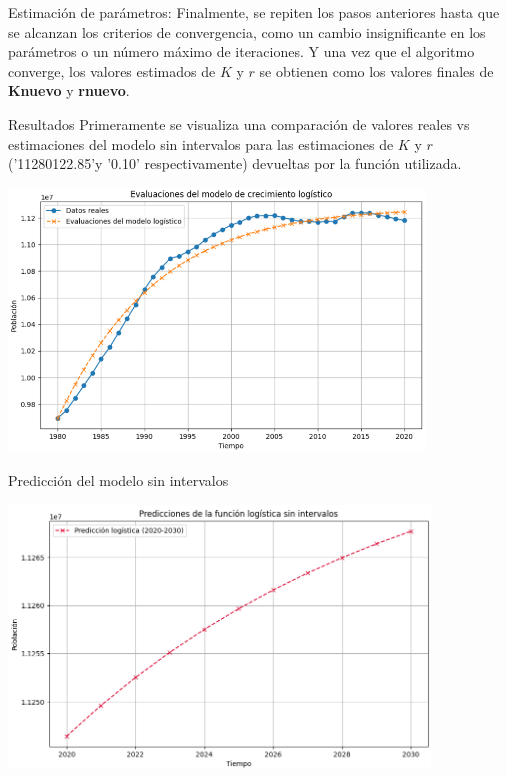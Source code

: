 \documentclass{beamer}
\begin{document}
\begin{frame}{Estimación de parámetros:}
    Finalmente, se repiten los pasos anteriores hasta que se alcanzan los criterios de convergencia, como un cambio insignificante en los parámetros o un número máximo de iteraciones. Y una vez que el algoritmo converge, los valores estimados de $K$ y $r$ se obtienen como los valores finales de \textbf{Knuevo} y \textbf{rnuevo}.
\end{frame}

\begin{frame}{Resultados}
    \small{Primeramente se visualiza una comparación de valores reales vs estimaciones del modelo sin intervalos para las estimaciones de $K$ y $r$ ('11280122.85'y '0.10' respectivamente) devueltas por la función utilizada.}
    \begin{center}
    \includegraphics[height = 7cm]{img/real_vs_pred.png}
    \end{center}
\end{frame}

\begin{frame}{Predicción del modelo sin intervalos}
    \begin{center}
        \includegraphics[height = 7cm]{img/graph_sin_intervalos.png}
    \end{center}
\end{frame}
\end{document}
